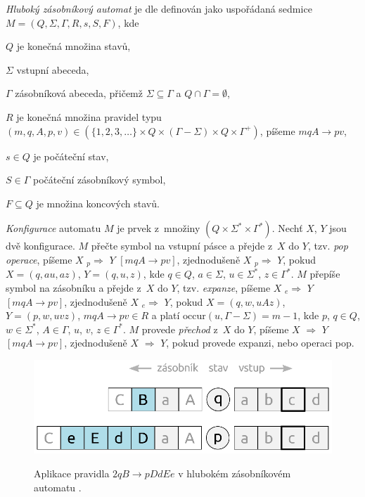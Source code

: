 
\begin{Def} \label{def_deep_pda}
\emph{Hluboký zásobníkový automat} je dle \cite{Meduna:DeepPDA} definován jako uspořádaná sedmice $M = (Q,\Sigma,\Gamma, R, s, S, F)$, kde 

\begin{description*}
\item  $Q$ je konečná množina stavů, 
\item  $\Sigma$ vstupní abeceda, 
\item  $\Gamma$ zásobníková abeceda, přičemž $\Sigma \subseteq \Gamma$ a $Q \cap \Gamma = \emptyset$,
\item  $R$ je konečná množina pravidel typu $(m, q, A, p, v) \in (\{1,2,3,\dots\} \times Q \times (\Gamma-\Sigma)\times   Q \times {\Gamma}^+)$, píšeme $mqA \rightarrow pv$,
\item  $s \in Q$ je počáteční stav, 
\item  $S \in \Gamma$ počáteční zásobníkový symbol, 
\item  $F \subseteq Q$ je množina koncových stavů.
\end{description*}

\emph{Konfigurace} automatu $M$ je prvek z~množiny $(Q \times \Sigma^* \times \Gamma^*)$. 
Nechť $X$, $Y$ jsou dvě konfigurace. 
$M$ přečte symbol na vstupní pásce a přejde z~$X$ do $Y$, tzv. \emph{pop operace}, píšeme $X$  ${}_p{\Rightarrow}$  $Y$ $[mqA \rightarrow pv]$, zjednodušeně $X$  ${}_p{\Rightarrow}$  $Y$, pokud $X = (q, au, az)$, $Y = (q, u, z)$, kde $q \in Q$, $a \in \Sigma$, $u \in \Sigma^*$, $z \in \Gamma^*$.
$M$ přepíše symbol na zásobníku a přejde z~$X$ do $Y$, tzv. \emph{expanze}, píšeme $X$  ${}_e{\Rightarrow}$  $Y$ $[mqA \rightarrow pv]$, zjednodušeně $X$  ${}_e{\Rightarrow}$  $Y$, pokud $X = (q, w, uAz)$, $Y = (p, w, uvz)$, $mqA \rightarrow pv \in R$ a platí $\mathrm{occur}(u,\Gamma - \Sigma) = m - 1 $, kde $p$, $q \in Q$, $w \in \Sigma^*$, $A \in \Gamma$, $u$, $v$, $z \in \Gamma^*$. 
$M$ provede \emph{přechod} z~$X$ do $Y$, píšeme $X$  ${\Rightarrow}$  $Y$ $[mqA \rightarrow pv]$, zjednodušeně $X$  ${\Rightarrow}$  $Y$, pokud provede expanzi, nebo operaci pop.


\begin{figure}[ht]
\centering
\includegraphics{img/bp_pda01.eps} \bigskip \\
\caption{Aplikace pravidla $2 q B \rightarrow p DdEe$ v hlubokém zásobníkovém automatu .}
\end{figure}



\end{Def}
